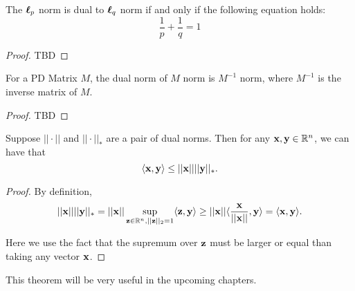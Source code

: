 \documentclass[main.tex]{subfiles}
\begin{document}
\begin{claim}
	The $\boldsymbol{\ell}_p$ norm is dual to $\boldsymbol{\ell}_q$ norm if and only if the following equation holds:
	\begin{equation}
	\frac{1}{p} + \frac{1}{q} = 1
	\end{equation}
\end{claim}
\begin{proof}
	TBD
\end{proof}

\begin{claim}
	For a PD Matrix $M$, the dual norm of $M$ norm is $M^{-1}$ norm, where $M^{-1}$ is the inverse matrix of $M$.
\end{claim}
\begin{proof}
	TBD
\end{proof}

\begin{theorem}
	Suppose $||\cdot||$ and $||\cdot||_*$ are a pair of dual norms. Then for any $\mathbf{x}, \mathbf{y} \in \mathbb{R}^n$, we can have that 
	\begin{equation}
	\langle\mathbf{x},\mathbf{y}\rangle \leq ||\mathbf{x}|| ||\mathbf{y}||_*.
	\end{equation}
\end{theorem}

\begin{proof}
	By definition, 
	\begin{equation*}
	||\mathbf{x}|| ||\mathbf{y}||_* = ||\mathbf{x}|| \sup\limits_{\mathbf{z} \in \mathbb{R}^n, ||\mathbf{z}||_2 = 1}  \langle \mathbf{z}, \mathbf{y} \rangle \geq ||\mathbf{x}|| \langle \frac{\mathbf{x}}{||\mathbf{x}||}, \mathbf{y} \rangle =  \langle\mathbf{x}, \mathbf{y} \rangle.
	\end{equation*}
	
	Here we use the fact that the supremum over $\mathbf{z}$ must be larger or equal than taking any vector $\mathbf{x}$.
\end{proof}

This theorem will be very useful in the upcoming chapters.
\end{document}
